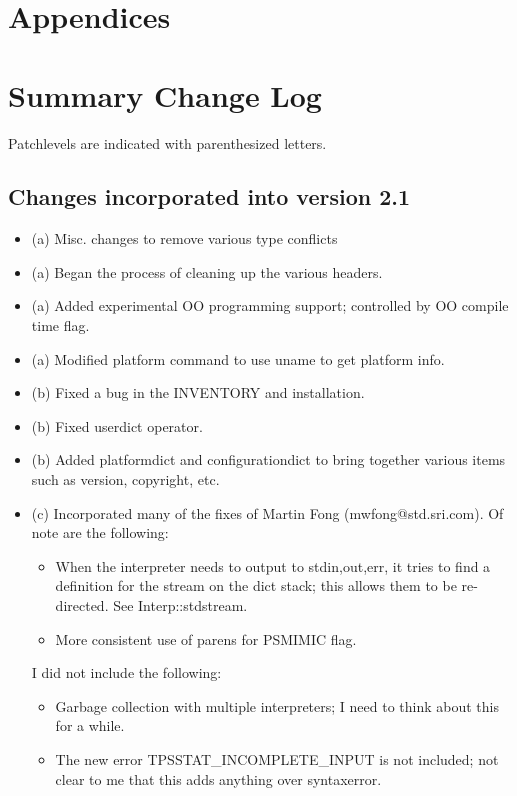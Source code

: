 


\newpage
\appendix
\section*{Appendices}
\section{Summary Change Log}
Patchlevels are indicated with parenthesized letters.

\subsection{Changes incorporated into version 2.1}
\begin{itemize}
\item (a) Misc. changes to remove various type conflicts
\item (a) Began the process of cleaning up the various headers.
\item (a) Added experimental OO programming support;
controlled by OO compile time flag.
\item (a) Modified platform command to use uname to get platform info.
\item (b) Fixed a bug in the INVENTORY and installation.
\item (b) Fixed userdict operator.
\item (b) Added platformdict and configurationdict to bring together
various items such as version, copyright, etc.
\item (c) Incorporated many of the fixes of
Martin Fong (mwfong@std.sri.com).
Of note are the following:
    \begin{itemize}
	\item When the interpreter needs to output to std{in,out,err},
	      it tries to find a definition for the stream on the dict stack;
	      this allows them to be re-directed.  See Interp::stdstream.
	\item More consistent use of parens for PSMIMIC flag.
    \end{itemize}
I did not include the following:
    \begin{itemize}
	\item Garbage collection with multiple interpreters;
		I need to think about this for a while.
	\item The new error TPSSTAT\_INCOMPLETE\_INPUT is not included;
		not clear to me that this adds anything over syntaxerror.

\end{itemize}
\end{itemize}
